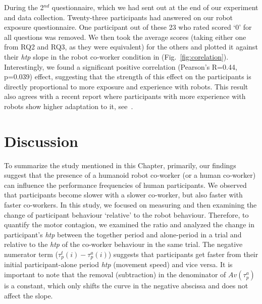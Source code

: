 During the 2$^{nd}$ questionnaire, which we had sent out at the end of our experiment and data collection. Twenty-three participants had answered on our robot exposure questionnaire. One participant out of these 23 who rated scored `0' for all questions was removed. We then took the average scores (taking either one from RQ2 and RQ3, as they were equivalent) for the others and plotted it against their {\it htp} slope in the robot co-worker condition in (Fig.~\ref{fig:corelation}). Interestingly, we found a significant positive correlation (Pearson's R=0.44, p=0.039) effect, suggesting that the strength of this effect on the participants is directly proportional to more exposure and experience with robots. This result also agrees with a recent report where participants with more experience with robots show higher adaptation to it, see~\cite{vannucci:roman:2017}.


\section{Discussion}

To summarize the study mentioned in this Chapter, primarily, our findings suggest that the presence of a humanoid robot co-worker (or a human co-worker) can influence the performance frequencies of human participants. We observed that participants become slower with a slower co-worker, but also faster with faster co-workers. In this study, we focused on measuring and then examining the change of participant behaviour `relative' to the robot behaviour. Therefore, to quantify the motor contagion, we examined the ratio and analyzed the change in participant's \textit{htp} between the together period and alone-period in a trial and relative to the {\it htp} of the co-worker behaviour in the same trial. The negative numerator term ($\tau_p^t(i)-\tau_p^a(i)$) suggests that participants get faster from their initial participant-alone period \textit{htp} (movement speed) and vice versa. It is important to note that the removal (subtraction) in the denominator of $Av(\tau_p^a)$ is a constant, which only shifts the curve in the negative abscissa and does not affect the slope.  


